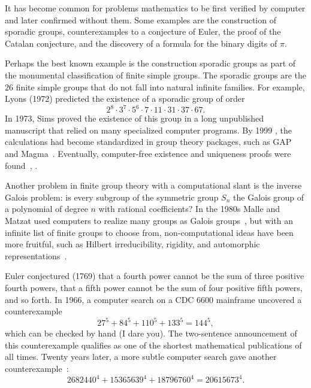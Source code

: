 \documentclass{llncs}
\begin{document}
It has become common for problems mathematics to be first verified by
computer and later confirmed without them.  Some examples are
the construction of sporadic groups, counterexamples to a conjecture
of Euler, the proof of the Catalan conjecture, and the discovery of a formula
for the binary digits of $\pi$.

Perhaps the best known example is the construction sporadic groups as
part of the monumental classification of finite simple groups.  The
sporadic groups are the $26$ finite simple groups that do not fall into
natural infinite families.  For example,  Lyons (1972) predicted
the existence of a sporadic group of order
\[
2^ 8\cdot 3^7\cdot 5^6\cdot  7\cdot 11 \cdot 31 \cdot 37 \cdot 67.
\]
In 1973, Sims proved the existence of this group in a long unpublished
manuscript that relied on many specialized computer programs.  By 1999
, the calculations had become standardized in group theory packages,
such as GAP and Magma~\cite{HS99}.  Eventually, computer-free
existence and uniqueness proofs were found~\cite{MParker},
\cite{AS92}.


Another problem in finite group theory with a computational slant is
the inverse Galois problem: is every subgroup of the symmetric group
$S_n$ the Galois group of a polynomial of degree $n$ with rational
coefficients?  In the 1980s Malle and Matzat used computers to realize
many groups as Galois groups~\cite{MM}, but with an infinite list of
finite groups to choose from, non-computational ideas have been more
fruitful, such as Hilbert irreducibility, rigidity, and automorphic
representations~\cite{KLS}.

\smallskip

Euler conjectured (1769) that a fourth power cannot be the sum of
three positive fourth powers, that a fifth power cannot be the sum of
four positive fifth powers, and so forth.  In 1966, a computer search
\cite{LP66} on a CDC 6600 mainframe uncovered a counterexample
\[
27^5 + 84^5 + 110^5 + 133^5 = 144^5,
\]
which can be checked by hand (I dare you).  The two-sentence
announcement of this counterexample qualifies as one of the shortest
mathematical publications of all times.  Twenty years later, a more
subtle computer search gave another counterexample~\cite{Elkies88}:
\[
2682440^4 + 15365639^4 + 18796760^4 = 20615673^4.
\]
\end{document}
